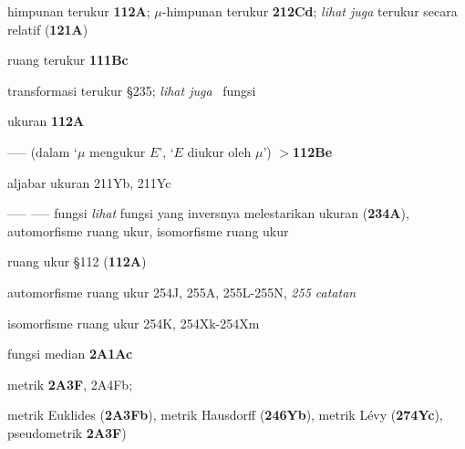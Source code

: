 himpunan terukur {\bf 112A};
  $\mu$-himpunan terukur {\bf 212Cd};
  {\it lihat juga }
terukur secara relatif ({\bf 121A})


ruang terukur {\bf 111Bc}



transformasi terukur \S235; 
  {\it lihat juga} \imp\ fungsi

ukuran {\bf 112A}

----- (dalam `$\mu$ mengukur $E$', `$E$ diukur oleh $\mu$') {\bf $\pmb{>}$112Be}

aljabar ukuran 211Yb, 211Yc






































----- ----- fungsi {\it lihat} fungsi yang inversnya melestarikan ukuran ({\bf 234A}),
automorfisme ruang ukur, isomorfisme ruang ukur






ruang ukur \S112 ({\bf 112A})

automorfisme ruang ukur 254J,
255A, 255L-255N, 
{\it 255 catatan}


isomorfisme ruang ukur 254K,
254Xk-254Xm









fungsi median {\bf 2A1Ac}





metrik {\bf 2A3F}, 2A4Fb;
  
  metrik Euklides ({\bf 2A3Fb}),
  metrik Hausdorff ({\bf 246Yb}),
  metrik L\'evy ({\bf 274Yc}),
  pseudometrik {\bf 2A3F})




